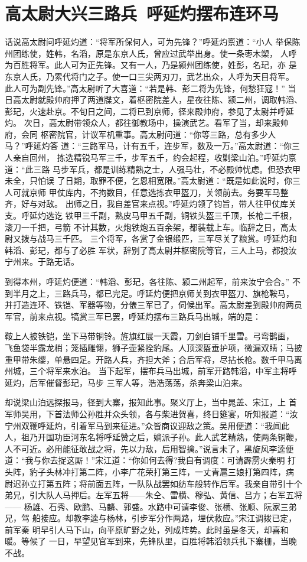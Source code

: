 \chapter{高太尉大兴三路兵~呼延灼摆布连环马}

话说高太尉问呼延灼道：“将军所保何人，可为先锋？”呼延灼禀道：“小人
举保陈州团练使，姓韩，名滔，原是东京人氏，曾应过武举出身。使一条枣木槊，
人呼为百胜将军。此人可为正先锋。又有一人，乃是颍州团练使，姓彭，名玘，亦
是东京人氏，乃累代将门之子。使一口三尖两刃刀，武艺出众，人呼为天目将军。
此人可为副先锋。”高太尉听了大喜道：“若是韩、彭二将为先锋，何愁狂寇！”
当日高太尉就殿帅府押了两道牒文，着枢密院差人，星夜往陈、颍二州，调取韩滔、
彭玘，火速赴京。不旬日之间，二将已到京师，径来殿帅府，参见了太尉并呼延灼。
次日，高太尉带领众人，都往御教场中，操演武艺。看军了当，却来殿帅府，会同
枢密院官，计议军机重事。高太尉问道：“你等三路，总有多少人马？”呼延灼答
道：“三路军马，计有五千，连步军，数及一万。”高太尉道：“你三人亲自回州，
拣选精锐马军三千，步军五千，约会起程，收剿梁山泊。”呼延灼禀道：“此三路
马步军兵，都是训练精熟之士，人强马壮，不必殿帅忧虑。但恐衣甲未全，只怕误
了日期，取罪不便，乞恩相宽限。”高太尉道：“既是如此说时，你三人可就京师
甲仗库内，不拘数目，任意选拣衣甲盔刀，关领前去。务要军马整齐，好与对敌。
出师之日，我自差官来点视。”呼延灼领了钧旨，带人往甲仗库关支。呼延灼选讫
铁甲三千副，熟皮马甲五千副，铜铁头盔三千顶，长枪二千根，滚刀一千把，弓箭
不计其数，火炮铁炮五百余架，都装载上车。临辞之日，高太尉又拨与战马三千匹。
三个将军，各赏了金银缎匹，三军尽关了粮赏。呼延灼和韩滔、彭玘，都与了必胜
军状，辞别了高太尉并枢密院等官，三人上马，都投汝宁州来。于路无话。

到得本州，呼延灼便道：“韩滔、彭玘，各往陈、颍二州起军，前来汝宁会合。”
不到半月之上，三路兵马，都已完足。呼延灼便把京师关到衣甲盔刀、旗枪鞍马，
并打造连环、铁铠、军器等物，分俵三军已了，伺候出军。高太尉差到殿帅府两员
军官，前来点视。犒赏三军已罢，呼延灼摆布三路兵马出城，端的是：

鞍上人披铁铠，坐下马带铜铃。旌旗红展一天霞，刀剑白铺千里雪。弓弯鹊画，
飞鱼袋半露龙梢；笼插雕翎，狮子壶紧拴豹尾。人顶深盔垂护项，微漏双睛；马披
重甲带朱缨，单悬四足。开路人兵，齐担大斧；合后军将，尽拈长枪。数千甲马离
州城，三个将军来水泊。
当下起军，摆布兵马出城，前军开路韩滔，中军主将呼延灼，后军催督彭玘，马步
三军人等，浩浩荡荡，杀奔梁山泊来。

却说梁山泊远探报马，径到大寨，报知此事。聚义厅上，当中晁盖、宋江，上
首军师吴用，下首法师公孙胜并众头领，各与柴进贺喜，终日筵宴，听知报道：“汝
宁州双鞭呼延灼，引着军马到来征进。”众皆商议迎敌之策。吴用便道：“我闻此
人，祖乃开国功臣河东名将呼延赞之后，嫡派子孙。此人武艺精熟，使两条铜鞭，
人不可近。必用能征敢战之将，先以力敌，后用智擒。”说言未了，黑旋风李逵便
道：“我与你去捉这厮！”宋江道：“你如何去得?我自有调度：可请霹雳火秦明
打头阵，豹子头林冲打第二阵，小李广花荣打第三阵，一丈青扈三娘打第四阵，病
尉迟孙立打第五阵；将前面五阵，一队队战罢如纺车般转作后军。我亲自带引十个
弟兄，引大队人马押后。左军五将——朱仝、雷横、穆弘、黄信、吕方；右军五将——
杨雄、石秀、欧鹏、马麟、郭盛。水路中可请李俊、张横、张顺、阮家三弟兄，驾
船接应。却教李逵与杨林，引步军分作两路，埋伏救应。”宋江调拨已定，前军秦
明早引人马下山，向平原旷野之处，列成阵势。此时虽是冬天，却喜和暖。等候了
一日，早望见官军到来，先锋队里，百胜将韩滔领兵扎下寨栅，当晚不战。

